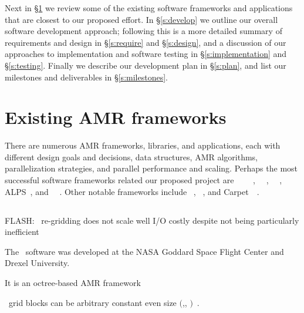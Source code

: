 \documentclass[10pt,twocolumn]{article}
\begin{document}
Next in \S\ref{s:review} we review some of the existing software
frameworks and applications that are closest to our proposed effort.
In \S\ref{s:develop} we outline our overall software development
approach; following this is a more detailed summary of requirements
and design in \S\ref{s:require} and \S\ref{s:design}, and a discussion
of our approaches to implementation and software testing in
\S\ref{s:implementation} and \S\ref{s:testing}.  Finally we describe
our development plan in \S\ref{s:plan}, and list our milestones and
deliverables in \S\ref{s:milestones}.

\section{Existing AMR frameworks} \label{s:review}

There are numerous AMR frameworks, libraries, and applications, each
with different design goals and decisions, data structures, AMR
algorithms, parallelization strategies, and parallel performance and
scaling.  Perhaps the most successful software frameworks related our
proposed project are
\paramesh~\cite{MaOl00}~\cite{OlMa05}~\cite{Ol06}~\cite{wwwparamesh},
\chombo~\cite{wwwchombo}~\cite{CoGr09},
\samrai~\cite{WiHo01}~\cite{wwwsamraicode}, ALPS~\cite{BuBu09}, and
\gadget~\cite{wwwgadget}~\cite{Sp05}.  Other notable frameworks
include \clawpack~\cite{wwwclawpack}, \grace~\cite{PaLi10}, and
Carpet~\cite{ScDi06}~\cite{wwwcarpet}.

\subsection{\paramesh} \label{ss:paramesh}


FLASH: \paramesh\ re-gridding does not scale well
       I/O costly despite not being particularly inefficient

The \paramesh\ software was developed at the NASA Goddard Space Flight
Center and Drexel University.

It is an octree-based AMR framework

\paramesh\ grid blocks can be arbitrary constant even size $($,, $)$~\cite{wwwparamesh}.
\end{document}
